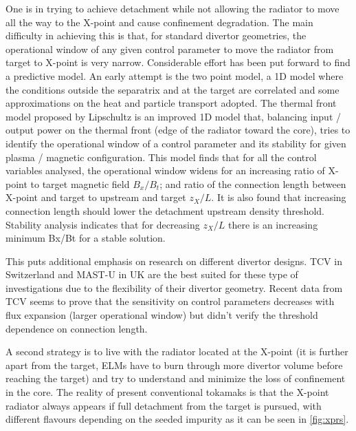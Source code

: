 One is in trying to achieve detachment while not allowing the radiator to move all the way to the X-point and cause confinement degradation. The main difficulty in achieving this is that, for standard divertor geometries, the operational window of any given control parameter to move the radiator from target to X-point is very narrow. Considerable effort has been put forward to find a predictive model. An early attempt is the two point model, a 1D model where the conditions outside the separatrix and at the target are correlated and some approximations on the heat and particle transport adopted.\cite{HOBBS1966,Hobbs1967,Mahdavi1981,Keilhacker1982,Harbour1984,Lackner1984,Stangeby2001} The thermal front model proposed by Lipschultz \cite{Lipschultz2016} is an improved 1D model that, balancing input / output power on the thermal front (edge of the radiator toward the core), tries to identify the operational window of a control parameter and its stability for given plasma / magnetic configuration. This model finds that for all the control variables analysed, the operational window widens for an increasing ratio of X-point to target magnetic field $B_x/B_t$; and ratio of the connection length between X-point and target to upstream and target $z_X/L$. It is also found that increasing connection length should lower the detachment upstream density threshold. Stability analysis indicates that for decreasing $z_X/L$ there is an increasing minimum Bx/Bt for a stable solution.\cite{Lipschultz2016}

This puts additional emphasis on research on different divertor designs. TCV in Switzerland and MAST-U in UK are the best suited for these type of investigations due to the flexibility of their divertor geometry. Recent data from TCV seems to prove that the sensitivity on control parameters decreases with flux expansion (larger operational window) but didn’t verify the threshold dependence on connection length. \cite{Theiler2017}

A second strategy is to live with the radiator located at the X-point (it is further apart from the target, ELMs have to burn through more divertor volume before reaching the target) and try to understand and minimize the loss of confinement in the core. The reality of present conventional tokamaks is that the X-point radiator always appears if full detachment from the target is pursued, with different flavours depending on the seeded impurity as it can be seen in \autoref{fig:xprs}.

